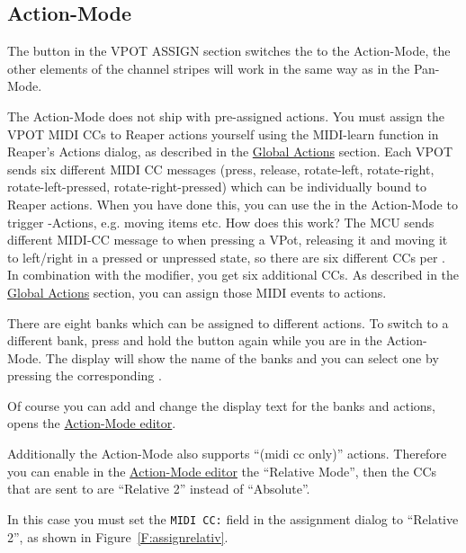 \subsection{Action-Mode}\label{actionmode} 

The button \eq in the VPOT ASSIGN section switches the \vpots to the
Action-Mode, the other elements of the channel stripes will work in
the same way as in the Pan-Mode.

The Action-Mode does not ship with pre-assigned actions. You must assign
the VPOT MIDI CCs to Reaper actions yourself using the MIDI-learn function
in Reaper's Actions dialog, as described in the
\hyperref[globalactions]{Global Actions} section. Each VPOT sends six
different MIDI CC messages (press, release, rotate-left, rotate-right,
rotate-left-pressed, rotate-right-pressed) which can be individually bound
to Reaper actions. 
When you have done this, you can use the \vpots in the Action-Mode to
trigger \reaper-Actions, e.g.  moving items etc. How does this work?
The MCU sends different MIDI-CC message to \reaper when pressing a
VPot, releasing it and moving it to left/right in a pressed or
unpressed state, so there are six different CCs per \vpots.  In
combination with the \shift modifier, you get six additional CCs. As
described in the \hyperref[globalactions]{Global Actions} section, you
can assign those MIDI events to \reaper actions.

There are eight banks which can be assigned to different actions. To switch to a different
bank, press and hold the \eq button again while you are in the Action-Mode.
The display will show the name of the banks and you can select one by
pressing the corresponding \vpot.

Of course you can add and change the display text for the banks and
actions, \alt \eq opens the \hyperref[F:Screenshot_Action_Mode]{Action-Mode
editor}.



Additionally the Action-Mode also supports  ``(midi cc only)'' actions. Therefore
you can enable in the \hyperref[F:Screenshot_Action_Mode]{Action-Mode
editor} the ``Relative Mode'', then the CCs that are sent to \reaper are
``Relative 2'' instead of ``Absolute''. 

In this case you must set the {\tt MIDI CC:} field in the \reaper assignment
dialog to ``Relative 2'', as shown in Figure~\ref{F:assignrelativ}.


